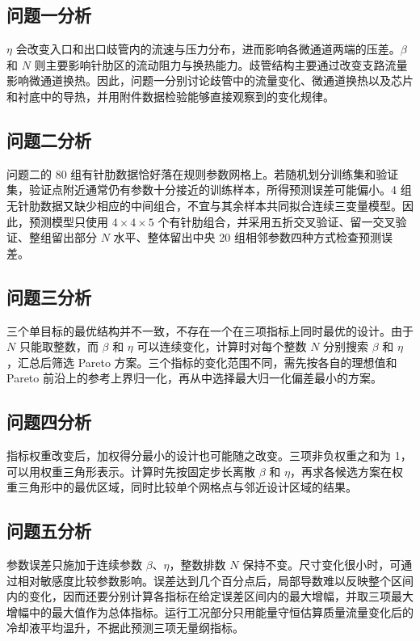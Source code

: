 \documentclass[withoutpreface,bwprint]{cumcmthesis}
\begin{document}
\subsection{问题一分析}
$\eta$ 会改变入口和出口歧管内的流速与压力分布，进而影响各微通道两端的压差。$\beta$ 和 $N$ 则主要影响针肋区的流动阻力与换热能力。歧管结构主要通过改变支路流量影响微通道换热。因此，问题一分别讨论歧管中的流量变化、微通道换热以及芯片和衬底中的导热，并用附件数据检验能够直接观察到的变化规律。

\subsection{问题二分析}
问题二的 80 组有针肋数据恰好落在规则参数网格上。若随机划分训练集和验证集，验证点附近通常仍有参数十分接近的训练样本，所得预测误差可能偏小。4 组无针肋数据又缺少相应的中间组合，不宜与其余样本共同拟合连续三变量模型。因此，预测模型只使用 $4\times4\times5$ 个有针肋组合，并采用五折交叉验证、留一交叉验证、整组留出部分 $N$ 水平、整体留出中央 20 组相邻参数四种方式检查预测误差。

\subsection{问题三分析}
三个单目标的最优结构并不一致，不存在一个在三项指标上同时最优的设计。由于 $N$ 只能取整数，而 $\beta$ 和 $\eta$ 可以连续变化，计算时对每个整数 $N$ 分别搜索 $\beta$ 和 $\eta$，汇总后筛选 Pareto 方案。三个指标的变化范围不同，需先按各自的理想值和 Pareto 前沿上的参考上界归一化，再从中选择最大归一化偏差最小的方案。

\subsection{问题四分析}
指标权重改变后，加权得分最小的设计也可能随之改变。三项非负权重之和为 1，可以用权重三角形表示。计算时先按固定步长离散 $\beta$ 和 $\eta$，再求各候选方案在权重三角形中的最优区域，同时比较单个网格点与邻近设计区域的结果。

\subsection{问题五分析}
参数误差只施加于连续参数 $\beta$、$\eta$，整数排数 $N$ 保持不变。尺寸变化很小时，可通过相对敏感度比较参数影响。误差达到几个百分点后，局部导数难以反映整个区间内的变化，因而还要分别计算各指标在给定误差区间内的最大增幅，并取三项最大增幅中的最大值作为总体指标。运行工况部分只用能量守恒估算质量流量变化后的冷却液平均温升，不据此预测三项无量纲指标。
\end{document}
